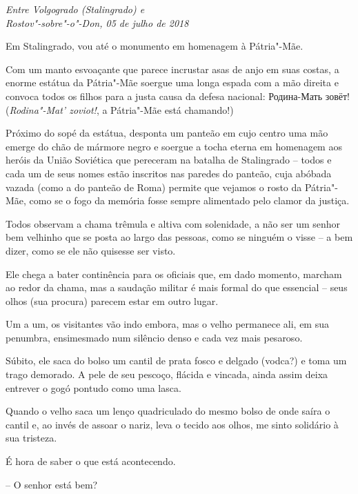 \begin{flushright}
\emph{Entre Volgogrado (Stalingrado) e\\Rostov"-sobre"-o"-Don, 05 de julho de 2018}
\end{flushright}

Em Stalingrado, vou até o monumento em homenagem à Pátria"-Mãe.

Com um manto esvoaçante que parece incrustar asas de anjo em suas
costas, a enorme estátua da Pátria"-Mãe soergue uma longa espada com a
mão direita e convoca todos os filhos para a justa causa da defesa
nacional: Родина-Мать зовёт! (\emph{Rodina"-Mat' zoviot!}, a Pátria"-Mãe
está chamando!)

Próximo do sopé da estátua, desponta um panteão em cujo centro uma mão
emerge do chão de mármore negro e soergue a tocha eterna em homenagem
aos heróis da União Soviética que pereceram na batalha de Stalingrado --
todos e cada um de seus nomes estão inscritos nas paredes do panteão,
cuja abóbada vazada (como a do panteão de Roma) permite que vejamos o
rosto da Pátria"-Mãe, como se o fogo da memória fosse sempre alimentado
pelo clamor da justiça.

Todos observam a chama trêmula e altiva com solenidade, a não ser um
senhor bem velhinho que se posta ao largo das pessoas, como se ninguém o
visse -- a bem dizer, como se ele não quisesse ser visto.

Ele chega a bater continência para os oficiais que, em dado momento,
marcham ao redor da chama, mas a saudação militar é mais formal do que
essencial -- seus olhos (sua procura) parecem estar em outro lugar.

Um a um, os visitantes vão indo embora, mas o velho permanece ali, em
sua penumbra, ensimesmado num silêncio denso e cada vez mais pesaroso.

Súbito, ele saca do bolso um cantil de prata fosco e delgado (vodca?) e
toma um trago demorado. A pele de seu pescoço, flácida e vincada, ainda
assim deixa entrever o gogó pontudo como uma lasca.

Quando o velho saca um lenço quadriculado do mesmo bolso de onde saíra o
cantil e, ao invés de assoar o nariz, leva o tecido aos olhos, me sinto
solidário à sua tristeza.

É hora de saber o que está acontecendo.

-- O senhor está bem?

